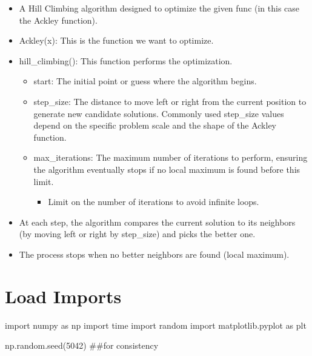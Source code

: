 \documentclass[
  letterpaper,
  DIV=11,
  numbers=noendperiod]{scrreprt}
\newenvironment{Shaded}{\begin{snugshade}}{\end{snugshade}}
\newcommand{\CommentTok}[1]{\textcolor[rgb]{0.37,0.37,0.37}{#1}}
\newcommand{\DecValTok}[1]{\textcolor[rgb]{0.68,0.00,0.00}{#1}}
\newcommand{\ImportTok}[1]{\textcolor[rgb]{0.00,0.46,0.62}{#1}}
\newcommand{\NormalTok}[1]{\textcolor[rgb]{0.00,0.23,0.31}{#1}}
\providecommand{\tightlist}{%
  \setlength{\itemsep}{0pt}\setlength{\parskip}{0pt}}\usepackage{longtable,booktabs,array}
\begin{document}
\begin{itemize}
\tightlist
\item
  A Hill Climbing algorithm designed to optimize the given func (in this
  case the Ackley function).
\item
  Ackley(x): This is the function we want to optimize.
\item
  hill\_climbing(): This function performs the optimization.

  \begin{itemize}
  \tightlist
  \item
    start: The initial point or guess where the algorithm begins.
  \item
    step\_size: The distance to move left or right from the current
    position to generate new candidate solutions. Commonly used
    step\_size values depend on the specific problem scale and the shape
    of the Ackley function.
  \item
    max\_iterations: The maximum number of iterations to perform,
    ensuring the algorithm eventually stops if no local maximum is found
    before this limit.

    \begin{itemize}
    \tightlist
    \item
      Limit on the number of iterations to avoid infinite loops.
    \end{itemize}
  \end{itemize}
\item
  At each step, the algorithm compares the current solution to its
  neighbors (by moving left or right by step\_size) and picks the better
  one.
\item
  The process stops when no better neighbors are found (local maximum).
\end{itemize}

\section{Load Imports}\label{load-imports}

\begin{Shaded}
\begin{Highlighting}[]
\ImportTok{import}\NormalTok{ numpy }\ImportTok{as}\NormalTok{ np}
\ImportTok{import}\NormalTok{ time}
\ImportTok{import}\NormalTok{ random}
\ImportTok{import}\NormalTok{ matplotlib.pyplot }\ImportTok{as}\NormalTok{ plt}

\NormalTok{np.random.seed(}\DecValTok{5042}\NormalTok{) }\CommentTok{\#\#for consistency}
\end{Highlighting}
\end{Shaded}
\end{document}
